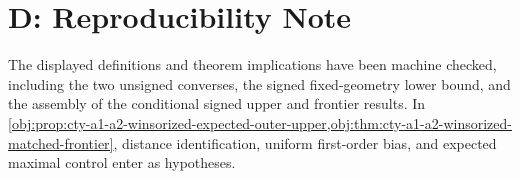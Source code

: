 \section{D: Reproducibility Note}
\label{sec:verification-note}

The displayed definitions and theorem implications have been machine checked, including the two unsigned converses, the signed fixed-geometry lower bound, and the assembly of the conditional signed upper and frontier results. In \cref{obj:prop:cty-a1-a2-winsorized-expected-outer-upper,obj:thm:cty-a1-a2-winsorized-matched-frontier}, distance identification, uniform first-order bias, and expected maximal control enter as hypotheses.
